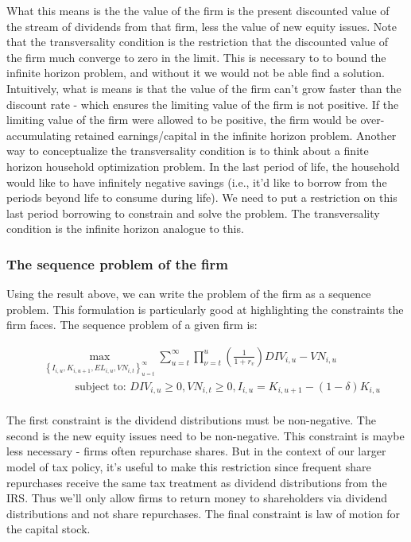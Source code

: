 \documentclass[letterpaper,12pt]{article}
\theoremstyle{definition}
\begin{document}
\begin{spacing}{1.5}
What this means is the the value of the firm is the present discounted value of the stream of dividends from that firm, less the value of new equity issues.  Note that the transversality condition is the restriction that the discounted value of the firm much converge to zero in the limit.  This is necessary to to bound the infinite horizon problem, and without it we would not be able find a solution.  Intuitively, what is means is that the value of the firm can't grow faster than the discount rate - which ensures the limiting value of the firm is not positive.  If the limiting value of the firm were allowed to be positive, the firm would be over-accumulating retained earnings/capital in the infinite horizon problem.  Another way to conceptualize the transversality condition is to think about a finite horizon household optimization problem.  In the last period of life, the household would like to have infinitely negative savings (i.e., it'd like to borrow from the periods beyond life to consume during life).  We need to put a restriction on this last period borrowing to constrain and solve the problem.  The transversality condition is the infinite horizon analogue to this.

\subsubsection*{The sequence problem of the firm}

Using the result above, we can write the problem of the firm as a sequence problem.  This formulation is particularly good at highlighting the constraints the firm faces.  The sequence problem of a given firm is:

\begin{equation}
\label{eqn:firm_seq_prob}
\begin{split}
&\max_{\left\{I_{i,u}, K_{i,u+1},EL_{i,u},VN_{i,t}\right\}_{u=t}^{\infty}} \sum_{u=t}^{\infty} \prod_{\nu=t}^{u} \left(\frac{1}{1+r_{v}}\right) DIV_{i,u}-VN_{i,u} \\
&\quad\quad\quad \text{subject to: } DIV_{i,u}\geq0, VN_{i,t}\geq0, I_{i,u} = K_{i,u+1}-(1-\delta)K_{i,u} \\
\end{split}
\end{equation}

The first constraint is the dividend distributions must be non-negative.  The second is the new equity issues need to be non-negative.  This constraint is maybe less necessary - firms often repurchase shares.  But in the context of our larger model of tax policy, it's useful to make this restriction since frequent share repurchases receive the same tax treatment as dividend distributions from the IRS.  Thus we'll only allow firms to return money to shareholders via dividend distributions and not share repurchases.   The final constraint is law of motion for the capital stock.


\end{spacing}
\end{document}
